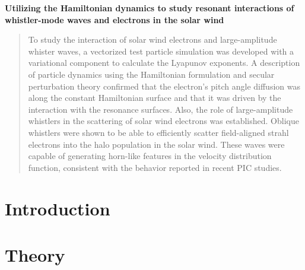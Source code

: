 \documentclass[12pt]{article}
\begin{document}
\begin{titlepage}
\begin{center}

\Large{\textbf{Utilizing the Hamiltonian dynamics to study resonant interactions
of whistler-mode waves and electrons in the solar wind}} \\
\vspace{2.5cm}
\vspace{2.5cm}
\begin{abstract}
    To study the interaction of solar wind electrons and large-amplitude
    whister waves, a vectorized test particle simulation was developed with a 
    variational component to calculate the Lyapunov exponents. A description of 
    particle dynamics using the Hamiltonian formulation and secular 
    perturbation theory confirmed that the electron's pitch angle diffusion was 
    along the constant Hamiltonian surface and that it was driven by the 
    interaction with the resonance surfaces. Also, the role of large-amplitude
    whistlers in the scattering of solar wind electrons was established. Oblique
    whistlers were shown to be able to efficiently scatter field-aligned strahl
    electrons into the halo population in the solar wind. These waves were 
    capable of generating horn-like features in the velocity distribution 
    function, consistent with the behavior reported in recent PIC studies.
\end{abstract}

\vspace{2.5cm}

\end{center}
\end{titlepage}

\newpage

\singlespacing
\tableofcontents
\doublespacing

\newpage
\linenumbers
\section{Introduction}\label{sec:intro}


\section{Theory}\label{sec:theory}



\end{document}

